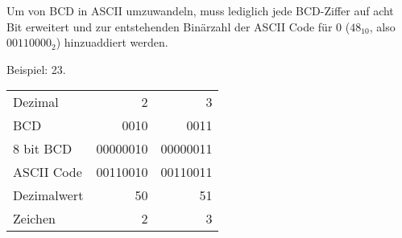 \documentclass{CInf_practice}
\begin{document}
Um von BCD in ASCII umzuwandeln, muss lediglich jede BCD-Ziffer auf acht Bit
erweitert und zur entstehenden Binärzahl der ASCII Code für 0 ($48_{10}$, also
$00110000_2$) hinzuaddiert werden.

Beispiel: 23.

\begin{center}
  \begin{tabular}{B|RR}
    Dezimal & 2 & 3 \\
    BCD     & 0010 & 0011 \\
    8 bit BCD & 00000010 & 00000011 \\
    ASCII Code & 00110010 & 00110011 \\
    Dezimalwert & 50 & 51 \\
    Zeichen & 2 & 3
  \end{tabular}
\end{center}
\end{document}
